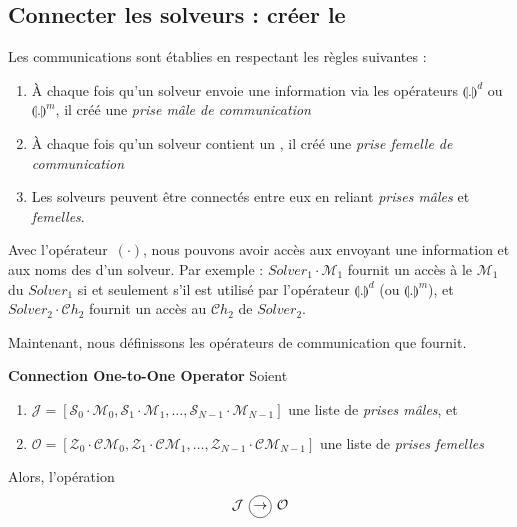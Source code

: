 \subsection{Connecter les solveurs : créer le \soset}


Les communications sont établies en respectant les règles suivantes :
\begin{enumerate}
\item  À chaque  fois qu'un  solveur  envoie une information via les opérateurs  $\llparenthesis .\rrparenthesis^{d}$  ou $\llparenthesis   .\rrparenthesis^{m}$, il créé une {\it prise mâle de communication} 
\item À  chaque fois qu'un  solveur contient un \opch{}, il  créé une {\it prise femelle de communication} 
\item Les solveurs peuvent être connectés entre eux en reliant {\it prises mâles} et {\it femelles}.
\end{enumerate}

Avec l'opérateur~$(\cdot)$, nous  pouvons avoir accès aux  \oms{} envoyant une information et aux noms des \opchs d'un solveur. Par exemple : $Solver_1\cdot\mathcal{M}_1$ fournit un accès à le \om{} $\mathcal{M}_1$ du $Solver_1$ si et seulement s'il est utilisé par l'opérateur  $\llparenthesis .\rrparenthesis^{d}$  (ou $\llparenthesis.\rrparenthesis^{m}$), et $Solver_2\cdot\mathcal{C}h_2$ fournit un accès au \opch{} $\mathcal{C}h_2$ de $Solver_2$.

Maintenant, nous définissons les opérateurs de communication que \posl{} fournit.

\begin{definition}\label{op_conn:1to1}
{\bf Connection One-to-One Operator} Soient
\begin{enumerate}
\item $\mathcal{J} = \left[\mathcal{S}_0\cdot \mathcal{M}_0, \mathcal{S}_1\cdot \mathcal{M}_1,\dots, \mathcal{S}_{N-1}\cdot \mathcal{M}_{N-1}\right]$ une liste de  {\it prises mâles}, et
\item $\mathcal{O} = \left[\mathcal{Z}_0\cdot \mathcal{CM}_0, \mathcal{Z}_1\cdot \mathcal{CM}_1,\dots, \mathcal{Z}_{N-1}\cdot \mathcal{CM}_{N-1}\right]$ une liste de {\it prises femelles}
\end{enumerate} Alors, l'opération
\[
\mathcal{J} \poslop{\rightarrow} \mathcal{O}
\]
\end{definition}

